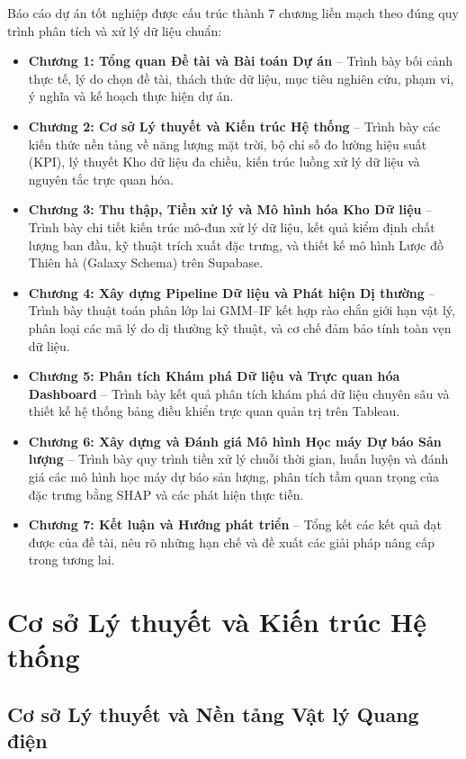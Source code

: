 \documentclass[12pt, a4paper]{report}
\begin{document}
Báo cáo dự án tốt nghiệp được cấu trúc thành 7 chương liền mạch theo đúng quy trình phân tích và xử lý dữ liệu chuẩn:
\begin{itemize}[noitemsep]
    \item \textbf{Chương 1: Tổng quan Đề tài và Bài toán Dự án} -- Trình bày bối cảnh thực tế, lý do chọn đề tài, thách thức dữ liệu, mục tiêu nghiên cứu, phạm vi, ý nghĩa và kế hoạch thực hiện dự án.
    \item \textbf{Chương 2: Cơ sở Lý thuyết và Kiến trúc Hệ thống} -- Trình bày các kiến thức nền tảng về năng lượng mặt trời, bộ chỉ số đo lường hiệu suất (KPI), lý thuyết Kho dữ liệu đa chiều, kiến trúc luồng xử lý dữ liệu và nguyên tắc trực quan hóa.
    \item \textbf{Chương 3: Thu thập, Tiền xử lý và Mô hình hóa Kho Dữ liệu} -- Trình bày chi tiết kiến trúc mô-đun xử lý dữ liệu, kết quả kiểm định chất lượng ban đầu, kỹ thuật trích xuất đặc trưng, và thiết kế mô hình Lược đồ Thiên hà (Galaxy Schema) trên Supabase.
    \item \textbf{Chương 4: Xây dựng Pipeline Dữ liệu và Phát hiện Dị thường} -- Trình bày thuật toán phân lớp lai GMM--IF kết hợp rào chắn giới hạn vật lý, phân loại các mã lý do dị thường kỹ thuật, và cơ chế đảm bảo tính toàn vẹn dữ liệu.
    \item \textbf{Chương 5: Phân tích Khám phá Dữ liệu và Trực quan hóa Dashboard} -- Trình bày kết quả phân tích khám phá dữ liệu chuyên sâu và thiết kế hệ thống bảng điều khiển trực quan quản trị trên Tableau.
    \item \textbf{Chương 6: Xây dựng và Đánh giá Mô hình Học máy Dự báo Sản lượng} -- Trình bày quy trình tiền xử lý chuỗi thời gian, huấn luyện và đánh giá các mô hình học máy dự báo sản lượng, phân tích tầm quan trọng của đặc trưng bằng SHAP và các phát hiện thực tiễn.
    \item \textbf{Chương 7: Kết luận và Hướng phát triển} -- Tổng kết các kết quả đạt được của đề tài, nêu rõ những hạn chế và đề xuất các giải pháp nâng cấp trong tương lai.
\end{itemize}

\newpage
\chapter{Cơ sở Lý thuyết và Kiến trúc Hệ thống}
\label{chap:lythuyet}

\section{Cơ sở Lý thuyết và Nền tảng Vật lý Quang điện}
\label{sec:co_so_ly_thuyet}
\end{document}

